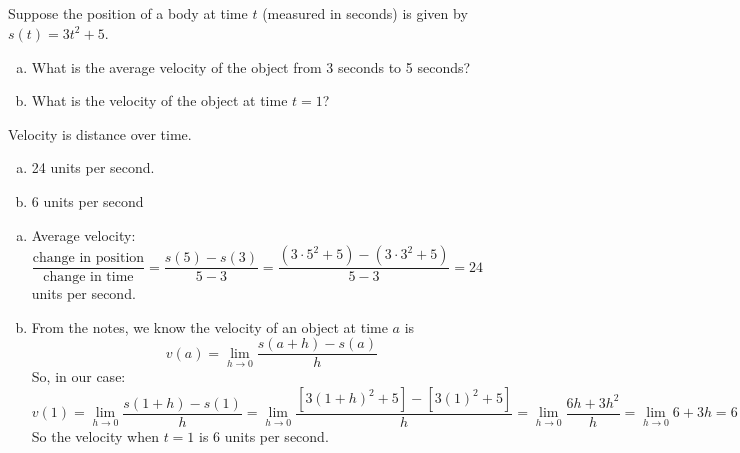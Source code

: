 \subsection*{\Procedural}
\begin{question}
Suppose the position of a body at time $t$ (measured in seconds) is given by
$s(t)=3t^2+5$.
\begin{enumerate}[(a)]
\item What is the average velocity of the object from 3 seconds to 5 seconds?
\item What is the velocity of the object at time $t=1$?
\end{enumerate}
\end{question}
\begin{hint}
Velocity is distance over time.
\end{hint}
\begin{answer}
\begin{enumerate}[(a)]
\item 24 units per second.
\item 6 units per second
\end{enumerate}
\end{answer}
\begin{solution}
\begin{enumerate}[(a)]
\item Average velocity: $\dfrac{\mbox{change in position}}{\mbox{change in time}} = \dfrac{s(5)-s(3)}{5-3} = \dfrac{(3\cdot 5^2+5)-(3\cdot 3^2+5)}{5-3}=24$ units per second.
\item From the notes, we know the velocity of an object at time $a$ is
\[v(a)=\lim_{h \rightarrow 0}\frac{s(a+h)-s(a)}{h}\]
So, in our case:
\[v(1)=\lim_{h \rightarrow 0}\frac{s(1+h)-s(1)}{h} =
\lim_{h \rightarrow 0}\frac{[3(1+h)^2+5]-[3(1)^2+5]}{h} =
\lim_{h \rightarrow 0}\frac{6h+3h^2}{h}=
\lim_{h \rightarrow 0}6+3h = 6\]
So the velocity when $t=1$ is 6 units per second.
\end{enumerate}
\end{solution}


